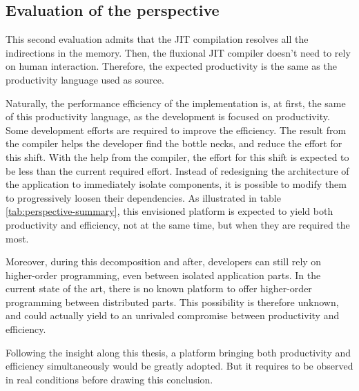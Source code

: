 \subsection{Evaluation of the perspective}

This second evaluation admits that the JIT compilation resolves all the indirections in the memory.
Then, the fluxional JIT compiler doesn't need to rely on human interaction.
Therefore, the expected productivity is the same as the productivity language used as source. %


Naturally, the performance efficiency of the implementation is, at first, the same of this productivity language, as the development is focused on productivity.
Some development efforts are required to improve the efficiency.
The result from the compiler helps the developer find the bottle necks, and reduce the effort for this shift.
With the help from the compiler, the effort for this shift is expected to be less than the current required effort.
Instead of redesigning the architecture of the application to immediately isolate components, it is possible to modify them to progressively loosen their dependencies.
As illustrated in table \ref{tab:perspective-summary}, this envisioned platform is expected to yield both productivity and efficiency, not at the same time, but when they are required the most.


Moreover, during this decomposition and after, developers can still rely on higher-order programming, even between isolated application parts.
In the current state of the art, there is no known platform to offer higher-order programming between distributed parts.
This possibility is therefore unknown, and could actually yield to an unrivaled compromise between productivity and efficiency.

Following the insight along this thesis, a platform bringing both productivity and efficiency simultaneously would be greatly adopted.
But it requires to be observed in real conditions before drawing this conclusion.

